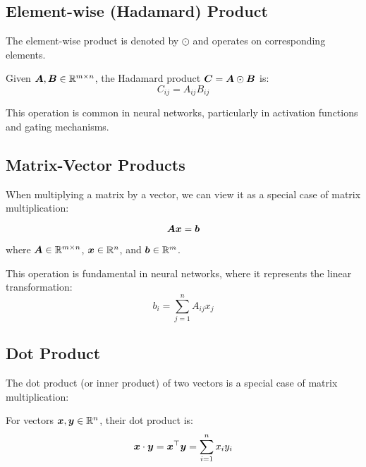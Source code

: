 \subsection{Element-wise (Hadamard) Product}

The element-wise product is denoted by $\odot$ and operates on corresponding elements.

\begin{definition}
Given $\boldsymbol{A}, \boldsymbol{B} \in \mathbb{R}^{m \times n}$, the Hadamard product $\boldsymbol{C} = \boldsymbol{A} \odot \boldsymbol{B}$ is:
\begin{equation}
    C_{ij} = A_{ij}B_{ij}
\end{equation}
\end{definition}

This operation is common in neural networks, particularly in activation functions and gating mechanisms.

\subsection{Matrix-Vector Products}

When multiplying a matrix by a vector, we can view it as a special case of matrix multiplication:

\begin{equation}
    \boldsymbol{A}\boldsymbol{x} = \boldsymbol{b}
\end{equation}

where $\boldsymbol{A} \in \mathbb{R}^{m \times n}$, $\boldsymbol{x} \in \mathbb{R}^n$, and $\boldsymbol{b} \in \mathbb{R}^m$.

This operation is fundamental in neural networks, where it represents the linear transformation:
\begin{equation}
    b_i = \sum_{j=1}^{n} A_{ij}x_j
\end{equation}

\subsection{Dot Product}

The dot product (or inner product) of two vectors is a special case of matrix multiplication:

\begin{definition}
For vectors $\boldsymbol{x}, \boldsymbol{y} \in \mathbb{R}^n$, their dot product is:
\begin{equation}
    \boldsymbol{x} \cdot \boldsymbol{y} = \boldsymbol{x}^\top\boldsymbol{y} = \sum_{i=1}^{n} x_i y_i
\end{equation}
\end{definition}

